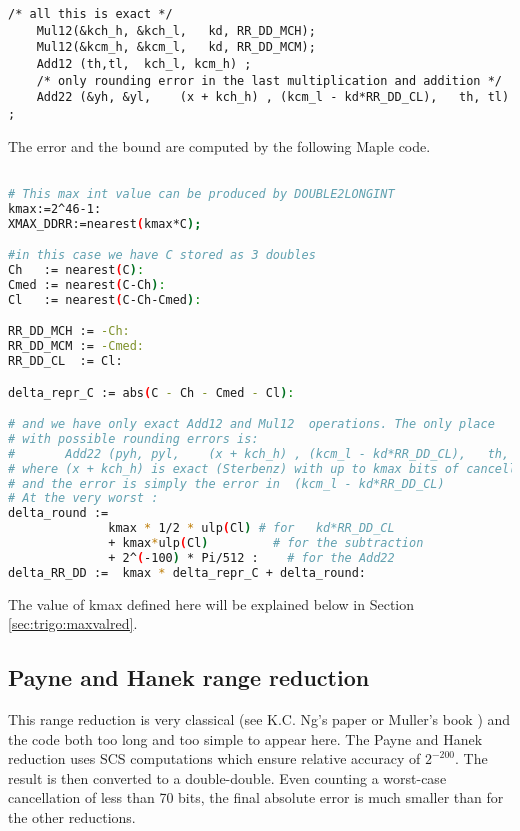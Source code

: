 \begin{lstlisting}[caption={Cody and Waite range reduction in
    double-double},firstnumber=20]
    /* all this is exact */
    Mul12(&kch_h, &kch_l,   kd, RR_DD_MCH);
    Mul12(&kcm_h, &kcm_l,   kd, RR_DD_MCM);
    Add12 (th,tl,  kch_l, kcm_h) ;
    /* only rounding error in the last multiplication and addition */
    Add22 (&yh, &yl,    (x + kch_h) , (kcm_l - kd*RR_DD_CL),   th, tl) ;
\end{lstlisting}


The error and the bound are computed by the following Maple code.

\begin{lstlisting}[caption={Maple script for computing constants for Cody and Waite
    double-double\label{trigo:lst:cwddrmaple}},
  language={sh}, numbers=none]% of course it's maple
%Skip a line here, I don't know why, otherwise latex eats the first line

# This max int value can be produced by DOUBLE2LONGINT
kmax:=2^46-1:
XMAX_DDRR:=nearest(kmax*C);

#in this case we have C stored as 3 doubles
Ch   := nearest(C):
Cmed := nearest(C-Ch):
Cl   := nearest(C-Ch-Cmed):

RR_DD_MCH := -Ch:
RR_DD_MCM := -Cmed:
RR_DD_CL  := Cl:

delta_repr_C := abs(C - Ch - Cmed - Cl):

# and we have only exact Add12 and Mul12  operations. The only place
# with possible rounding errors is:
#       Add22 (pyh, pyl,    (x + kch_h) , (kcm_l - kd*RR_DD_CL),   th, tl) ;
# where (x + kch_h) is exact (Sterbenz) with up to kmax bits of cancellation
# and the error is simply the error in  (kcm_l - kd*RR_DD_CL)
# At the very worst :
delta_round :=
              kmax * 1/2 * ulp(Cl) # for   kd*RR_DD_CL
              + kmax*ulp(Cl)         # for the subtraction
              + 2^(-100) * Pi/512 :    # for the Add22
delta_RR_DD :=  kmax * delta_repr_C + delta_round:
\end{lstlisting}

The value of kmax defined here will be explained below in Section
\ref{sec:trigo:maxvalred}.

\subsection{Payne and Hanek range reduction }

This range reduction is very classical (see K.C. Ng's
paper\cite{Ng1992} or Muller's book \cite{Muller97}) and the code both
too long and too simple to appear here. The Payne and Hanek reduction
uses SCS computations which ensure relative accuracy of $2^{-200}$.
The result is then converted to a double-double.  Even counting a
worst-case cancellation of less than 70 bits, the final absolute error
is much smaller than for the other reductions.

